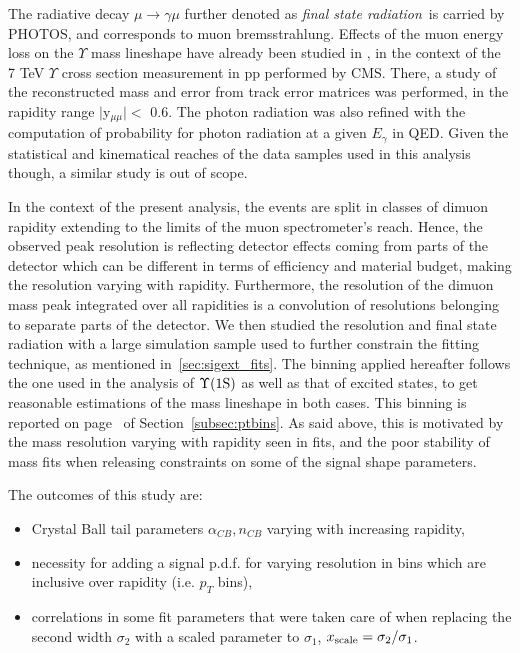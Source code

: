The radiative decay $\mu
\rightarrow \gamma\mu$ further denoted as \textit{final state
  radiation}~is
carried by \textsc{PHOTOS}, and corresponds to muon
bremsstrahlung. Effects of the muon energy loss on the $\Upsilon$ mass lineshape have
already been studied in \cite{CMS-PAS-BPH-12-006},
in the context of the 7 TeV $\Upsilon$ cross section measurement in pp
performed by CMS. There, a study of the
reconstructed mass and error from track error matrices was
performed, in the rapidity range $|$y$_{\mu\mu}| <$ 0.6. The photon
radiation was also refined with the
computation of probability for photon radiation at a given
$E_{\gamma}$ in QED. Given the statistical and kinematical reaches of
the data samples used in this analysis though, a similar study is out of scope.

In the context of the present analysis, the events are split in
classes of dimuon rapidity extending to the limits of the muon
spectrometer's reach. Hence, the observed peak resolution is
reflecting detector effects coming from parts of the detector which
can be different in terms of efficiency and material budget, making
the resolution varying with rapidity. Furthermore, the resolution of
the dimuon mass peak integrated over all rapidities is a convolution
of resolutions belonging to separate parts of the detector.  We then
studied the resolution and final state radiation with a large
simulation sample used to further constrain the fitting technique, as
mentioned in~\ref{sec:sigext_fits}. The binning applied hereafter follows the one used in the analysis of
$\Upsilon\mathrm{(1S)}$ as well as that of excited states, to get reasonable
estimations of the mass lineshape in both cases. This binning is
reported on page~\pageref{binning} of Section~\ref{subsec:ptbins}. As
said above, this is motivated by the mass resolution varying with
rapidity seen in fits, and the poor stability of mass fits
when releasing constraints on some of the signal shape parameters.

The outcomes of this study are:
\begin{itemize}
\item{Crystal Ball tail parameters
    $\alpha_{CB},n_{CB}$ varying with increasing rapidity,}
\item{necessity for adding a signal p.d.f. for varying resolution in
    bins which are inclusive over rapidity (i.e. $p_{T}$ bins),}
\item{correlations in some fit parameters that were taken care
    of when replacing the second width $\sigma_{2}$ with a scaled
    parameter to $\sigma_{1}$, $x_{{\rm scale}} = \sigma_{2}/\sigma_{1}$.}
\end{itemize}

